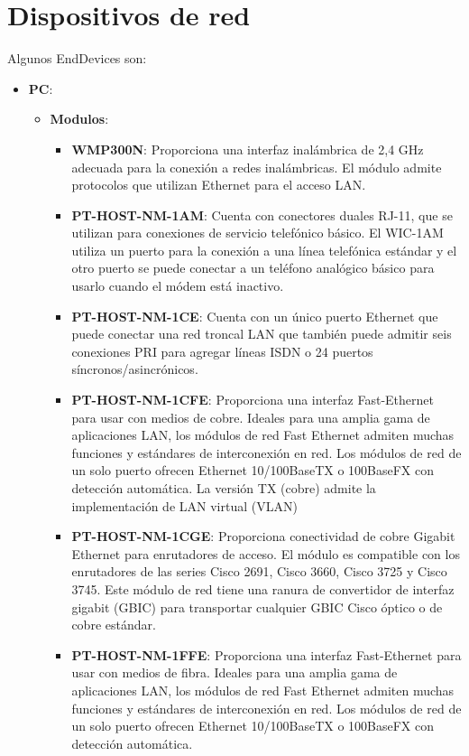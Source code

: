 \documentclass{article}
\begin{document}
    \section{Dispositivos de red}
       Algunos EndDevices son:
       \begin{itemize}
           \item\textbf{PC}:
            \begin{itemize}
                \item\textbf{Modulos}:
                \begin{itemize}
                    \item\textbf{WMP300N}: Proporciona una interfaz inalámbrica de 2,4 GHz adecuada para la conexión a redes inalámbricas. El módulo admite protocolos que utilizan Ethernet para el acceso LAN.
                    \item\textbf{PT-HOST-NM-1AM}: Cuenta con conectores duales RJ-11, que se utilizan para conexiones de servicio telefónico básico. El WIC-1AM utiliza un puerto para la conexión a una línea telefónica estándar y el otro puerto se puede conectar a un teléfono analógico básico para usarlo cuando el módem está inactivo.
                    \item\textbf{PT-HOST-NM-1CE}: Cuenta con un único puerto Ethernet que puede conectar una red troncal LAN que también puede admitir seis conexiones PRI para agregar líneas ISDN o 24 puertos síncronos/asincrónicos.
                    \item\textbf{PT-HOST-NM-1CFE}: Proporciona una interfaz Fast-Ethernet para usar con medios de cobre. Ideales para una amplia gama de aplicaciones LAN, los módulos de red Fast Ethernet admiten muchas funciones y estándares de interconexión en red. Los módulos de red de un solo puerto ofrecen Ethernet 10/100BaseTX o 100BaseFX con detección automática. La versión TX (cobre) admite la implementación de LAN virtual (VLAN)
                    \item\textbf{PT-HOST-NM-1CGE}: Proporciona conectividad de cobre Gigabit Ethernet para enrutadores de acceso. El módulo es compatible con los enrutadores de las series Cisco 2691, Cisco 3660, Cisco 3725 y Cisco 3745. Este módulo de red tiene una ranura de convertidor de interfaz gigabit (GBIC) para transportar cualquier GBIC Cisco óptico o de cobre estándar.
                    \item\textbf{PT-HOST-NM-1FFE}: Proporciona una interfaz Fast-Ethernet para usar con medios de fibra. Ideales para una amplia gama de aplicaciones LAN, los módulos de red Fast Ethernet admiten muchas funciones y estándares de interconexión en red. Los módulos de red de un solo puerto ofrecen Ethernet 10/100BaseTX o 100BaseFX con detección automática.

\end{itemize}
\end{itemize}
\end{itemize}
\end{document}
